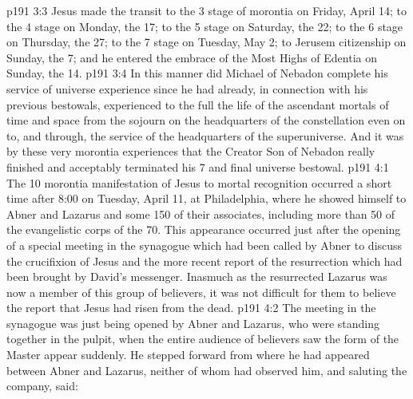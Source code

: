 \vs p191 3:3 Jesus made the transit to the 3 stage of morontia on Friday, April 14; to the 4 stage on Monday, the 17; to the 5 stage on Saturday, the 22; to the 6 stage on Thursday, the 27; to the 7 stage on Tuesday, May 2; to Jerusem citizenship on Sunday, the 7; and he entered the embrace of the Most Highs of Edentia on Sunday, the 14.
\vs p191 3:4 In this manner did Michael of Nebadon complete his service of universe experience since he had already, in connection with his previous bestowals, experienced to the full the life of the ascendant mortals of time and space from the sojourn on the headquarters of the constellation even on to, and through, the service of the headquarters of the superuniverse. And it was by these very morontia experiences that the Creator Son of Nebadon really finished and acceptably terminated his 7 and final universe bestowal.
\vs p191 4:1 The 10 morontia manifestation of Jesus to mortal recognition occurred a short time after 8:00 on Tuesday, April 11, at Philadelphia, where he showed himself to Abner and Lazarus and some 150 of their associates, including more than 50 of the evangelistic corps of the 70. This appearance occurred just after the opening of a special meeting in the synagogue which had been called by Abner to discuss the crucifixion of Jesus and the more recent report of the resurrection which had been brought by David’s messenger. Inasmuch as the resurrected Lazarus was now a member of this group of believers, it was not difficult for them to believe the report that Jesus had risen from the dead.
\vs p191 4:2 The meeting in the synagogue was just being opened by Abner and Lazarus, who were standing together in the pulpit, when the entire audience of believers saw the form of the Master appear suddenly. He stepped forward from where he had appeared between Abner and Lazarus, neither of whom had observed him, and saluting the company, said:

